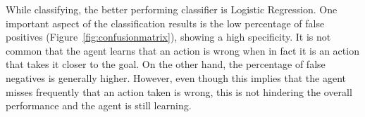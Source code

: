 \documentclass[journal]{IEEEtran}
\begin{document}
{{%

While classifying, the better performing classifier is Logistic Regression. One important aspect of the classification results is the low percentage of false positives (Figure~\ref{fig:confusionmatrix}), showing a high specificity.  It is not common that the agent learns that an action is wrong when in fact it is an action that takes it closer to the goal. On the other hand, the percentage of false negatives is generally higher.  However, even though this implies that the agent misses frequently that an action taken is wrong, this is not hindering the overall performance and the agent is still learning.



}}
\end{document}
